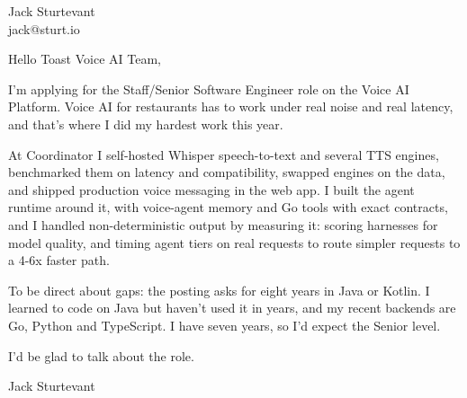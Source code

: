 \documentclass[11pt]{article}
\begin{document}
\raggedright

{\namefont\fontsize{20pt}{24pt}\selectfont Jack Sturtevant}\\[-0.3em]
jack@sturt.io

\vspace{1.2em}

Hello Toast Voice AI Team,

I'm applying for the Staff/Senior Software Engineer role on the Voice AI Platform. Voice AI for restaurants has to work under real noise and real latency, and that's where I did my hardest work this year.

At Coordinator I self-hosted Whisper speech-to-text and several TTS engines, benchmarked them on latency and compatibility, swapped engines on the data, and shipped production voice messaging in the web app. I built the agent runtime around it, with voice-agent memory and Go tools with exact contracts, and I handled non-deterministic output by measuring it: scoring harnesses for model quality, and timing agent tiers on real requests to route simpler requests to a 4-6x faster path.

To be direct about gaps: the posting asks for eight years in Java or Kotlin. I learned to code on Java but haven't used it in years, and my recent backends are Go, Python and TypeScript. I have seven years, so I'd expect the Senior level.

I'd be glad to talk about the role.

\vspace{0.6em}
Jack Sturtevant
\end{document}
